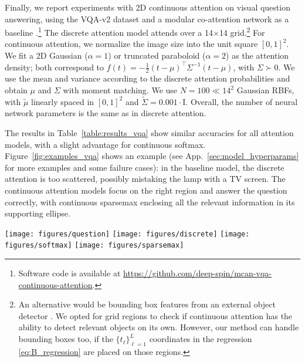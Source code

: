 \documentclass{article}
\begin{document}
Finally, we report experiments with 2D continuous attention on visual question answering, using the VQA-v2 dataset \cite{Goyal2019} and a modular co-attention network as a baseline \cite{Yu2019}.\footnote{Software code is available at \url{https://github.com/deep-spin/mcan-vqa-continuous-attention}.} The discrete attention model attends over a  14$\times$14 grid.\footnote{An alternative would be bounding box features from an external object detector \citep{anderson2018bottom}. We opted for grid regions to check if continuous attention has the ability to detect relevant objects on its own. However, our method can handle bounding boxes too, if  the $\{t_\ell\}_{\ell=1}^L$ coordinates in the  regression
\eqref{eq:B_regression} are placed on those regions.} For continuous attention, we normalize the image size into the unit square $[0,1]^2$. We fit a 2D Gaussian ($\alpha=1$) or truncated paraboloid ($\alpha=2$) as the attention density; both correspond  to  $f(t)=-\frac{1}{2}(t-\mu)^\top\Sigma^{-1}(t-\mu)$, with $\Sigma \succ 0$. We use the mean and variance according to the discrete attention probabilities and obtain $\mu$ and $\Sigma$ with moment matching. We use $N = 100 \ll 14^2$ Gaussian RBFs, with $\tilde{\mu}$ linearly spaced in  $[0,1]^2$ and $\tilde{\Sigma}=0.001\cdot \mathrm{I}$. Overall, the number of neural network parameters is the same as in discrete attention. 

The results in Table~\ref{table:results_vqa} show similar accuracies for all attention models, with a slight advantage for continuous softmax. Figure~\ref{fig:examples_vqa} shows an example (see App.~\ref{sec:model_hyperparams} for more examples and some failure cases): in the baseline model, the discrete attention is too scattered, possibly mistaking the lamp with a TV screen.  The continuous attention models focus on the right region and answer the question correctly, with continuous sparsemax enclosing all the relevant information in its supporting ellipse.


\begin{figure*}[t]
\centering
\texttt{[image: figures/question]}
\texttt{[image: figures/discrete]}
\texttt{[image: figures/softmax]}
\texttt{[image: figures/sparsemax]}
\caption{\label{fig:examples_vqa}Attention maps for an example in VQA-v2: original image, discrete attention, continuous softmax, and continuous sparsemax. The latter encloses all probability mass within the outer ellipse.}
\end{figure*}
\end{document}
